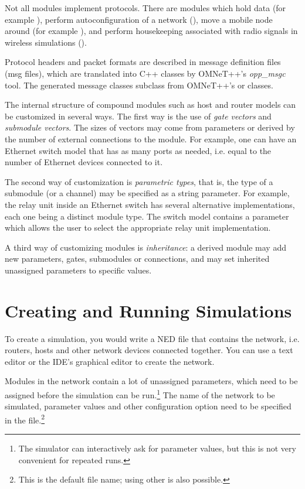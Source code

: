 Not all modules implement protocols. There are modules which hold data (for
example ), perform autoconfiguration of a network
(), move a mobile node around (for example
), and perform housekeeping associated with
radio signals in wireless simulations ().

Protocol headers and packet formats are described in message definition
files (msg files), which are translated into C++ classes by OMNeT++'s
\textit{opp\_msgc} tool. The generated message classes subclass from OMNeT++'s
 or  classes.

The internal structure of compound modules such as host and router models
can be customized in several ways. The first way is the use of \textit{gate
vectors} and \textit{submodule vectors}. The sizes of vectors may come from
parameters or derived by the number of external connections to the module.
For example, one can have an Ethernet switch model that has as many ports
as needed, i.e. equal to the number of Ethernet devices connected to it.

The second way of customization is \textit{parametric types}, that is, the
type of a submodule (or a channel) may be specified as a string parameter.
For example, the relay unit inside an Ethernet switch has several
alternative implementations, each one being a distinct module type. The
switch model contains a parameter which allows the user to select the
appropriate relay unit implementation.

A third way of customizing modules is \textit{inheritance}: a derived
module may add new parameters, gates, submodules or connections, and may
set inherited unassigned parameters to specific values.


\section{Creating and Running Simulations}

To create a simulation, you would write a NED file that contains the network,
i.e. routers, hosts and other network devices connected together. You can
use a text editor or the IDE's graphical editor to create the network.

Modules in the network contain a lot of unassigned parameters, which need
to be assigned before the simulation can be run.\footnote{The simulator can
interactively ask for parameter values, but this is not very convenient
for repeated runs.} The name of the network to be simulated, parameter values
and other configuration option need to be specified in the 
file.\footnote{This is the default file name; using other is also possible.}

